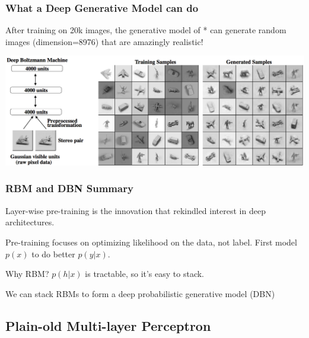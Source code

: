 \begin{frame}
\frametitle{What a Deep Generative Model can do}
After training on 20k images, the generative model of \cite{salakhutdinov09dbm}* can generate random images (dimension=8976) that are amazingly realistic!
\vspace{1cm} 
\centerline{\includegraphics[scale=0.17]{figs/dbm_generation}}
\end{frame}

\begin{frame}
\frametitle{RBM and DBN Summary}
\be
\item Layer-wise pre-training is the innovation that rekindled interest in deep architectures. \pause
\item Pre-training focuses on optimizing likelihood on the data, not label. First model $p(x)$ to do better $p(y|x)$. \pause
\item Why RBM? $p(h|x)$ is tractable, so it's easy to stack.\pause
\item We can stack RBMs to form a deep probabilistic generative model (DBN)
\ee
\end{frame}


\subsection[MLP]{Plain-old Multi-layer Perceptron}

